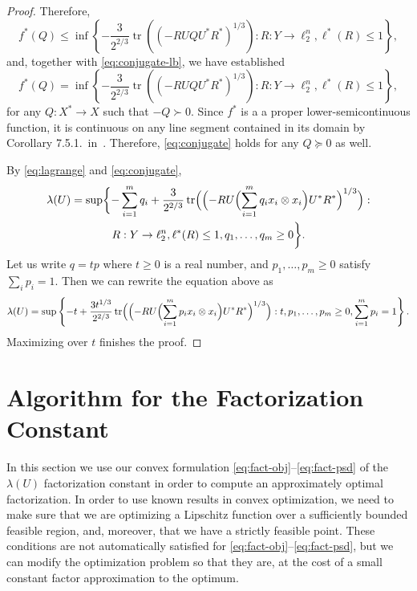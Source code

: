 \documentclass[11pt]{article}
\DeclareMathOperator{\tr}{tr}
\begin{document}
\begin{proof}
  Therefore,
  \[
    f^*(Q) \le
    \inf\left\{ -\frac{3}{2^{2/3}} \tr((-RUQU^*R^*)^{1/3}):
    R:Y \to \ell_2^n,\ell^*(R) \le 1\right\},
  \]
  and, together with \eqref{eq:conjugate-lb}, we have established 
  \begin{equation}
    \label{eq:conjugate}
    f^*(Q) =
    \inf\left\{ -\frac{3}{2^{2/3}} \tr((-RUQU^*R^*)^{1/3}):
    R:Y \to \ell_2^n,\ell^*(R) \le 1\right\},
  \end{equation}
  for any $Q:X^*\to X$ such that $-Q \succ 0$. Since $f^*$ is a
  a proper lower-semicontinuous function, it is continuous on any
  line segment contained in its domain by Corollary
  7.5.1.~in~\cite{Rockafellar}. Therefore, \eqref{eq:conjugate}
  holds for any $Q \succeq 0$ as well. 
  
  By \eqref{eq:lagrange} and \eqref{eq:conjugate}, 
  \begin{multline}
  \lambda(U) = 
  \sup \biggl\{-\sum_{i = 1}^m{q_i} 
  + \frac{3}{2^{2/3}} \tr\Bigl(\Bigl(-RU\Bigl(\sum_{i = 1}^m{q_i  x_i\otimes  x_i}\Bigr)U^*R^*\Bigr)^{1/3}\Bigr):\\
  R:Y \to \ell_2^n,\ell^*(R) \le 1,
  q_1, \ldots, q_m \ge 0\biggr\}.
  \end{multline}
  Let us write $q = tp$ where $t \ge 0$ is a real number, and $p_1,
  \ldots, p_m \ge 0$ satisfy $\sum_i p_i = 1$. Then we can rewrite the
  equation above as
  \[
  \lambda(U) = 
  \sup\left\{-t + 
    \frac{3t^{1/3}}{2^{2/3}} \tr\Bigl(\Bigl(-RU\Bigl(\sum_{i = 1}^m{p_i  x_i\otimes x_i}\Bigr)U^*R^*\Bigr)^{1/3}\Bigr):
    t, p_1, \ldots, p_m \ge 0, \sum_{i=1}^m p_i = 1\right\}.
  \]
  Maximizing over $t$ finishes the proof. 
\end{proof}

\section{Algorithm for the Factorization Constant}
\label{sect:fact-alg}

In this section we use our convex formulation
\eqref{eq:fact-obj}--\eqref{eq:fact-psd} of the $\lambda(U)$
factorization constant in order to compute an approximately optimal
factorization. In order to use known results in convex optimization,
we need to make sure that we are optimizing a Lipschitz function over
a sufficiently bounded feasible region, and, moreover, that we have a
strictly feasible point. These conditions are not automatically
satisfied for \eqref{eq:fact-obj}--\eqref{eq:fact-psd}, but we can
modify the optimization problem so that they are, at the cost of a
small constant factor approximation to the optimum. 
\end{document}
